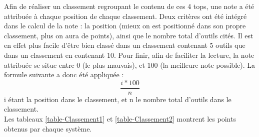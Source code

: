 \documentclass[paper=a4, fontsize=11pt]{scrartcl}
\begin{document}
Afin de réaliser un classement regroupant le contenu de ces 4 tops, une note a été attribuée à chaque position de chaque classement. Deux critères ont été intégré dans le calcul de la note : la position (mieux on est positionné dans son propre classement, plus on aura de points), ainsi que le nombre total d'outils cités. Il est en effet plus facile d'être bien classé dans un classement contenant 5 outils que dans un classement en contenant 10. Pour finir, afin de faciliter la lecture, la note attribuée se situe entre 0 (le plus mauvais), et 100 (la meilleure note possible). La formule suivante a donc été appliquée :
\[\frac{i * 100}{n}\]
i étant la position dans le classement, et n le nombre total d'outils dans le classement.\\

Les tableaux \ref{table-Classement1} et \ref{table-Classement2} montrent les points obtenus par chaque système.

\begin{table}[]
\quad
{}
    \caption{Classements SoftwareTestingHelp et Comparitech}
    \label{table-Classement1}

\end{table}
\end{document}

